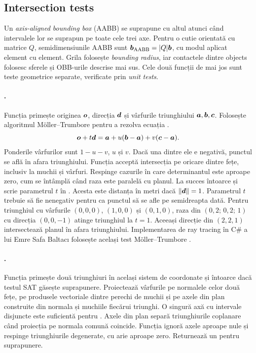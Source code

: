 \documentclass[11pt,a4paper]{article}
\begin{document}
\subsection{Intersection tests}

Un \emph{axis-aligned bounding box} (AABB) se suprapune cu altul
atunci când intervalele lor se suprapun pe toate cele trei axe.
Pentru o cutie orientată cu matrice \(Q\), semidimensiunile
AABB sunt \(\boldsymbol{b}_{\mathrm{AABB}}=|Q|\boldsymbol{b}\), cu modul
aplicat element cu element. Grila folosește \emph{bounding radius},
iar contactele dintre objects folosesc sferele și OBB-urile
descrise mai sus. Cele două funcții de mai jos sunt teste geometrice
separate, verificate prin \emph{unit tests}.

\paragraph{.}
Funcția primește originea \(\boldsymbol{o}\), direcția \(\boldsymbol{d}\) și
vârfurile triunghiului \(\boldsymbol{a},\boldsymbol{b},\boldsymbol{c}\). Folosește
algoritmul Möller--Trumbore pentru a rezolva ecuația
\cite{moller-trumbore}.
\begin{equation}
 \boldsymbol{o}+t\boldsymbol{d}=\boldsymbol{a}+u(\boldsymbol{b}-\boldsymbol{a})+v(\boldsymbol{c}-\boldsymbol{a}).
\end{equation}
Ponderile vârfurilor sunt \(1-u-v\), \(u\) și \(v\). Dacă una
dintre ele e negativă, punctul se află în afara triunghiului.
Funcția acceptă intersecția pe oricare dintre fețe, inclusiv la
muchii și vârfuri. Respinge cazurile în care determinantul este
aproape zero, cum se întâmplă când raza este paralelă cu planul.
La succes întoarce  și scrie parametrul \(t\) în
. Acesta este distanța în metri dacă
\(\|\boldsymbol{d}\|=1\). Parametrul \(t\) trebuie să fie nenegativ
pentru ca punctul să se afle pe semidreapta dată.
Pentru triunghiul cu vârfurile \((0,0,0)\), \((1,0,0)\) și
\((0,1,0)\), raza din \((0{,}2;\,0{,}2;\,1)\) cu direcția
\((0,0,-1)\) atinge triunghiul la \(t=1\). Aceeași direcție
din \((2,2,1)\) intersectează planul în afara triunghiului.
Implementarea de ray tracing în C\# a lui Emre Safa Baltacı
folosește același test Möller--Trumbore \cite{medium-ray}.

\paragraph{.}
Funcția primește două triunghiuri în același sistem de coordonate
și întoarce  dacă testul SAT găsește suprapunere.
Proiectează vârfurile pe normalele celor două fețe, pe produsele
vectoriale dintre perechi de muchii și pe axele din plan construite
din normala și muchiile fiecărui triunghi. O singură axă cu
intervale disjuncte este suficientă pentru . Axele din plan
separă triunghiurile coplanare când proiecția pe normala comună
coincide. Funcția ignoră axele aproape nule și respinge
triunghiurile degenerate, cu arie aproape zero. Returnează un
 pentru suprapunere.
\end{document}
